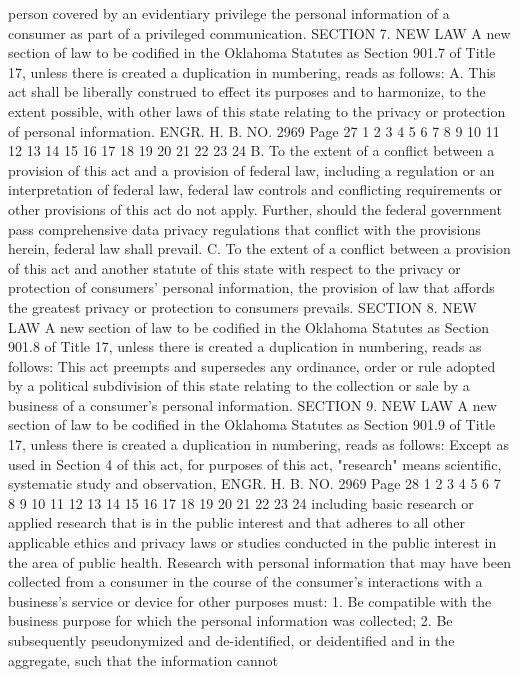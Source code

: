 person covered by an evidentiary privilege the personal information
of a consumer as part of a privileged communication.
SECTION 7. NEW LAW A new section of law to be codified
in the Oklahoma Statutes as Section 901.7 of Title 17, unless there
is created a duplication in numbering, reads as follows:
A. This act shall be liberally construed to effect its purposes
and to harmonize, to the extent possible, with other laws of this
state relating to the privacy or protection of personal information.
ENGR. H. B. NO. 2969 Page 27
1
2
3
4
5
6
7
8
9
10
11
12
13
14
15
16
17
18
19
20
21
22
23
24
B. To the extent of a conflict between a provision of this act
and a provision of federal law, including a regulation or an
interpretation of federal law, federal law controls and conflicting
requirements or other provisions of this act do not apply. Further,
should the federal government pass comprehensive data privacy
regulations that conflict with the provisions herein, federal law
shall prevail.
C. To the extent of a conflict between a provision of this act
and another statute of this state with respect to the privacy or
protection of consumers' personal information, the provision of law
that affords the greatest privacy or protection to consumers
prevails.
SECTION 8. NEW LAW A new section of law to be codified
in the Oklahoma Statutes as Section 901.8 of Title 17, unless there
is created a duplication in numbering, reads as follows:
This act preempts and supersedes any ordinance, order or rule
adopted by a political subdivision of this state relating to the
collection or sale by a business of a consumer's personal
information.
SECTION 9. NEW LAW A new section of law to be codified
in the Oklahoma Statutes as Section 901.9 of Title 17, unless there
is created a duplication in numbering, reads as follows:
Except as used in Section 4 of this act, for purposes of this
act, "research" means scientific, systematic study and observation, 
ENGR. H. B. NO. 2969 Page 28
1
2
3
4
5
6
7
8
9
10
11
12
13
14
15
16
17
18
19
20
21
22
23
24
including basic research or applied research that is in the public
interest and that adheres to all other applicable ethics and privacy
laws or studies conducted in the public interest in the area of
public health. Research with personal information that may have
been collected from a consumer in the course of the consumer's
interactions with a business's service or device for other purposes
must:
1. Be compatible with the business purpose for which the
personal information was collected;
2. Be subsequently pseudonymized and de-identified, or deidentified and in the aggregate, such that the information cannot
